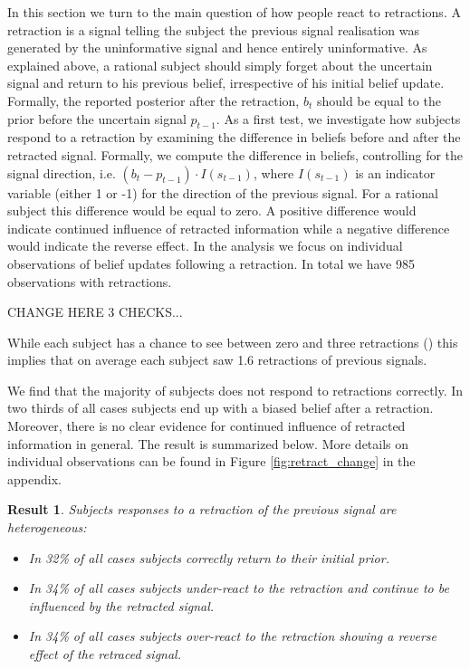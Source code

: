 \documentclass{article}
\newtheorem{result}{Result}
\newenvironment{Result}{\begin{result} \rm }{\end{result}}
\begin{document}
In this section we turn to the main question of how people react to retractions. A retraction is a signal telling the subject the previous signal realisation was generated by the uninformative signal and hence entirely uninformative. As explained above, a rational subject should simply forget about the uncertain signal and return to his previous belief, irrespective of his initial belief update. Formally, the reported posterior after the retraction, $b_t$ should be equal to the prior before the uncertain signal $p_{t-1}$. As a first test, we investigate how subjects respond to a retraction by examining the difference in beliefs before and after the retracted signal. Formally, we compute the difference in beliefs, controlling for the signal direction, i.e. $(b_t-p_{t-1}) \cdot I(s_{t-1})$, where $I(s_{t-1})$ is an indicator variable (either 1 or -1) for the direction of the previous signal. For a rational subject this difference would be equal to zero. A positive difference would indicate continued influence of retracted information while a negative difference would indicate the reverse effect. In the analysis we focus on individual observations of belief updates following a retraction. In total we have 985 observations with retractions. 

CHANGE HERE 3 CHECKS...

While each subject has a chance to see between zero and three retractions () this implies that on average each subject saw 1.6 retractions of previous signals. 

We find that the majority of subjects does not respond to retractions correctly. In two thirds of all cases subjects end up with a biased belief after a retraction. Moreover, there is no clear evidence for continued influence of retracted information in general. The result is summarized below. More details on individual observations can be found in Figure \ref{fig:retract_change} in the appendix.

\begin{Result}
    Subjects responses to a retraction of the previous signal are heterogeneous:
    \begin{itemize}
        \item In 32\% of all cases subjects correctly return to their initial prior.
        \item In 34\% of all cases subjects under-react to the retraction and continue to be influenced by the retracted signal.
        \item In 34\% of all cases subjects over-react to the retraction showing a reverse effect of the retraced signal.
    \end{itemize} 
\end{Result}
\end{document}
